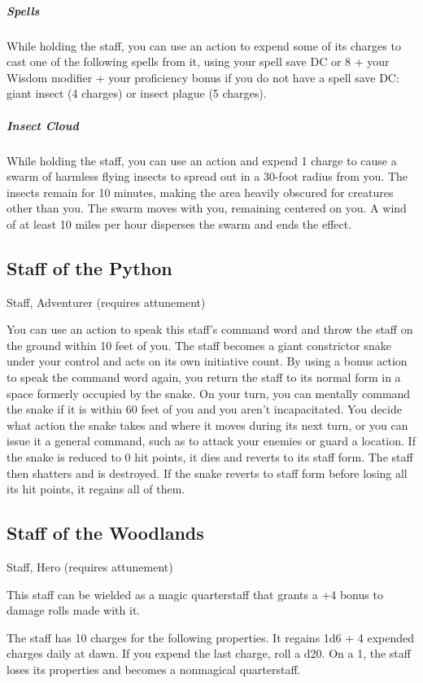 \subparagraph*{Spells} While holding the staff, you can use an action to expend some of its charges to cast one of the following spells from it, using your spell save DC or 8 + your Wisdom modifier + your proficiency bonus if you do not have a spell save DC: giant insect (4 charges) or insect plague (5 charges).

\subparagraph*{Insect Cloud} While holding the staff, you can use an action and expend 1 charge to cause a swarm of harmless flying insects to spread out in a 30-foot radius from you. The insects remain for 10 minutes, making the area heavily obscured for creatures other than you. The swarm moves with you, remaining centered on you. A wind of at least 10 miles per hour disperses the swarm and ends the effect.

\subsection{Staff of the Python}
Staff, Adventurer (requires attunement) 

You can use an action to speak this staff's command word and throw the staff on the ground within 10 feet of you. The staff becomes a giant constrictor snake under your control and acts on its own initiative count. By using a bonus action to speak the command word again, you return the staff to its normal form in a space formerly occupied by the snake.  On your turn, you can mentally command the snake if it is within 60 feet of you and you aren't incapacitated. You decide what action the snake takes and where it moves during its next turn, or you can issue it a general command, such as to attack your enemies or guard a location.  If the snake is reduced to 0 hit points, it dies and reverts to its staff form. The staff then shatters and is destroyed. If the snake reverts to staff form before losing all its hit points, it regains all of them.

\subsection{Staff of the Woodlands}
Staff, Hero (requires attunement)

This staff can be wielded as a magic quarterstaff that grants a +4 bonus to damage rolls made with it.

The staff has 10 charges for the following properties. It regains 1d6 + 4 expended charges daily at dawn. If you expend the last charge, roll a d20. On a 1, the staff loses its properties and becomes a nonmagical quarterstaff.

